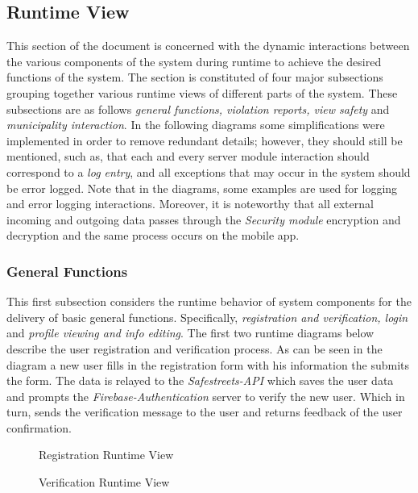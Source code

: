 \subsection{Runtime View}
This section of the document is concerned with the dynamic interactions between the various components of the system during runtime to achieve the desired functions of the system. The section is constituted of four major subsections grouping together various runtime views of different parts of the system. These subsections are as follows \emph{general functions, violation reports, view safety} and \emph{municipality interaction}. In the following diagrams some simplifications were implemented in order to remove redundant details; however, they should still be mentioned, such as, that each and every server module interaction should correspond to a \emph{log entry}, and all exceptions that may occur in the system should be error logged. Note that in the diagrams, some examples are used for logging and error logging interactions. Moreover, it is noteworthy that all external incoming and outgoing data passes through the \emph{Security module} encryption and decryption and the same process occurs on the mobile app.

\subsubsection{General Functions}
This first subsection considers the runtime behavior of system components for the delivery of basic general functions. Specifically, \emph{registration and verification, login} and \emph{profile viewing and info editing}. The first two runtime diagrams below describe the user registration and verification process. As can be seen in the diagram a new user fills in the registration form with his information the submits the form. The data is relayed to the \emph{Safestreets-API} which saves the user data and prompts the \emph{Firebase-Authentication} server to verify the new user. Which in turn, sends the verification message to the user and returns feedback of the user confirmation.

\begin{figure}[H]
\caption{Registration Runtime View}
\label{fig:RuntimeReg}
\centering

\end{figure}

\begin{figure}[H]
\caption{Verification Runtime View}
\label{fig:RuntimeVer}
\centering

\end{figure}


